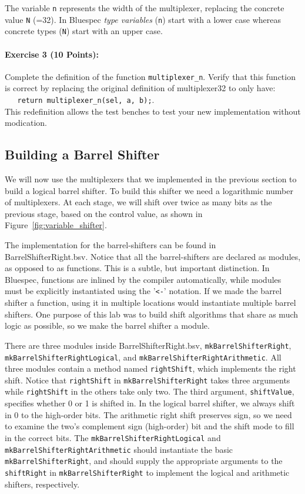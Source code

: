 \documentclass{article}
\begin{document}
The variable \texttt{n} represents the width of the multiplexer, replacing the
concrete value \texttt{N} (=32). In Bluespec \emph{type variables} (\texttt{n})
start with a lower case whereas concrete types (\texttt{N}) start with an upper
case.

\noindent \paragraph{\bf Exercise 3 (10 Points):} Complete the definition of the function
\verb|multiplexer_n|. Verify that this function is correct by replacing the
original definition of multiplexer32 to only have:
\\ \verb|   return multiplexer_n(sel, a, b);|.
\\ This redefinition allows the test benches to test
your new implementation without modication.

\subsection{Building a Barrel Shifter}

We will now use the multiplexers that we implemented in the previous section to
build a logical barrel shifter. To build this shifter we need a logarithmic
number of multiplexers. At each stage, we will shift over twice as many bits as
the previous stage, based on the control value, as shown in
Figure~\ref{fig:variable_shifter}.

The implementation for the barrel-shifters can be found in
BarrelShifterRight.bsv.  Notice that all the barrel-shifters are declared as
modules, as opposed to as functions. This is a subtle, but important
distinction. In Bluespec, functions are inlined by the compiler automatically,
while modules must be explicitly instantiated using the '\verb|<-|' notation.
If we made the barrel shifter a function, using it in multiple locations would
instantiate multiple barrel shifters. One purpose of this lab was to build
shift algorithms that share as much logic as possible, so we make the barrel
shifter a module.

\sloppy
There are three modules inside BarrelShifterRight.bsv,
\texttt{mkBarrelShifterRight}, \texttt{mkBarrelShifterRightLogical}, and
\texttt{mkBarrelShifterRightArithmetic}. All three modules contain a method
named \texttt{rightShift}, which implements the right shift. Notice that
\texttt{rightShift} in \texttt{mkBarrelShifterRight} takes three arguments
while \texttt{rightShift} in the others take only two. The third argument,
\texttt{shiftValue}, specifies whether 0 or 1 is shifted in.  In the logical
barrel shifter, we always shift in 0 to the high-order bits. The arithmetic
right shift preserves sign, so we need to examine the two's complement sign
(high-order) bit and the shift mode to fill in the correct bits. The
\texttt{mkBarrelShifterRightLogical} and
\texttt{mkBarrelShifterRightArithmetic} should instantiate the basic
\texttt{mkBarrelShifterRight}, and should supply the appropriate arguments to
the \texttt{shiftRight} in \texttt{mkBarrelShifterRight} to implement the
logical and arithmetic shifters, respectively.
\end{document}

